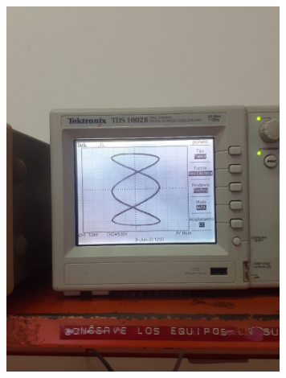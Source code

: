 \documentclass[12pt]{article}
\begin{document}
\begin{enumerate}
		\begin{center}
			\includegraphics[width=12cm,height=12cm]{Img/l3}
		\end{center}
		
	\end{enumerate}
	
\end{document}
